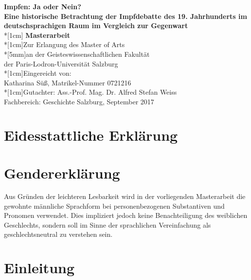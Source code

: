 \documentclass[
    a4paper,
    12pt,
    hyphens,
    chapterprefix=true,
    headheight=33pt,
    footheight=29pt,
    headings=optiontohead, %
]{scrartcl}
\begin{document}
\thispagestyle{empty}
\begin{center}

\textbf{ 
{\Large
	Impfen: Ja oder Nein? \\
	Eine historische Betrachtung der Impfdebatte des 19. Jahrhunderts im deutschsprachigen Raum im Vergleich zur Gegenwart
	}
}
\\*[1cm]\Large { \textbf{Masterarbeit} 
\\*[1cm]Zur Erlangung des Master of Arts
\\*[5mm]an der Geisteswissenschaftlichen Fakultät
\\der Paris-Lodron-Universität Salzburg
\\*[1cm]Eingereicht von:
\\Katharina Süß, Matrikel-Nummer 0721216
\\*[1cm]Gutachter: Ass.-Prof. Mag. Dr. Alfred Stefan Weiss
\\Fachbereich: Geschichte
\vfill
Salzburg, September 2017
}

\end{center}


\newpage
\tableofcontents
\newpage

\section{Eidesstattliche Erklärung}
\newpage
\section{Gendererklärung}
Aus Gründen der leichteren Lesbarkeit wird in der vorliegenden Masterarbeit die gewohnte männliche Sprachform bei personenbezogenen Substantiven und Pronomen verwendet. Dies impliziert jedoch keine Benachteiligung des weiblichen Geschlechts, sondern soll im Sinne der sprachlichen Vereinfachung als geschlechtsneutral zu verstehen sein.
\newpage


\section{Einleitung}
\end{document}

